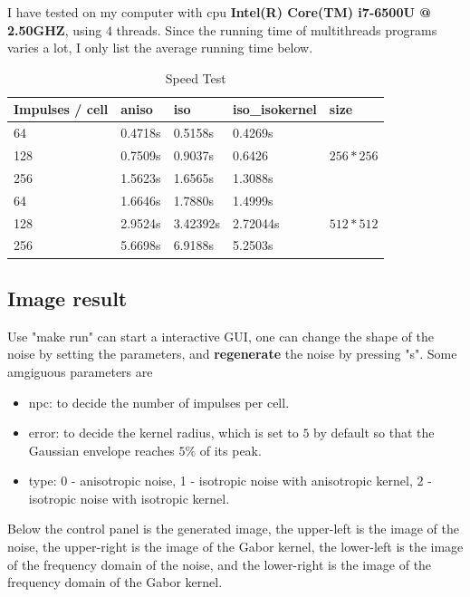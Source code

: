\documentclass[journal, a4paper]{IEEEtran}
\begin{document}
  I have tested on my computer with cpu \textbf{Intel(R) Core(TM) i7-6500U @ 2.50GHZ}, using $4$ threads. 
  Since the running time of multithreads programs varies a lot, I only list the average running time below. 
  \begin{table}[!htb]
    \centering
    \caption{Speed Test}
    \begin{tabular}{|l|l|l|l|l|}
    \hline
    Impulses / cell &  aniso &  iso & iso\_isokernel & size \\ \hline
    64 &  0.4718s &  0.5158s &  0.4269s & \multirow{3}{*}{$256*256$} \\ \cline{1-4}
    128 &  0.7509s &  0.9037s &  0.6426 &                       \\ \cline{1-4}
    256 &   1.5623s &  1.6565s &  1.3088s &                       \\ \hline
    64 &  1.6646s &  1.7880s &  1.4999s & \multirow{3}{*}{$512*512$} \\ \cline{1-4}
    128 &  2.9524s &  3.42392s &  2.72044s &                       \\ \cline{1-4}
    256 &  5.6698s &  6.9188s &  5.2503s &                       \\ \hline
    \end{tabular}
  \end{table}

  \subsection{Image result}
  Use "make run"
  can start a interactive GUI, one can change the shape of the noise by setting the parameters, 
  and \textbf{regenerate} the noise by pressing "s". Some amgiguous parameters are
  \begin{itemize}
    \item npc: to decide the number of impulses per cell.
    \item error: to decide the kernel radius, which is set to $5$ by default so that 
    the Gaussian envelope reaches $5\%$ of its peak.
    \item type: 0 - anisotropic noise, 1 - isotropic noise with anisotropic kernel, 2 - isotropic noise with isotropic kernel.
  \end{itemize}

  Below the control panel is the generated image, 
  the upper-left is the image of the noise, the upper-right is the image of the Gabor kernel,
  the lower-left is the image of the frequency domain of the noise, and the lower-right is the
  image of the frequency domain of the Gabor kernel.
\end{document}
